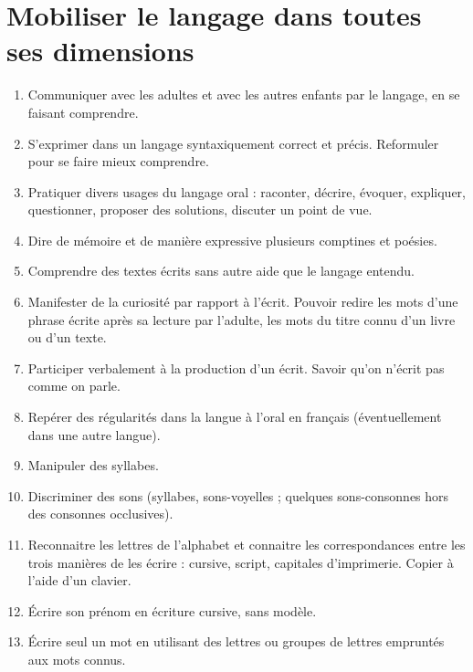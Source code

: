 \section{Mobiliser le langage dans toutes ses dimensions}
\begin{enumerate}
\item Communiquer avec les adultes et avec les autres enfants par le langage, en se faisant comprendre.
\item S’exprimer dans un langage syntaxiquement correct et précis. Reformuler pour se faire mieux comprendre.
\item Pratiquer divers usages du langage oral : raconter, décrire, évoquer, expliquer, questionner, proposer des solutions, discuter un point de vue.
\item Dire de mémoire et de manière expressive plusieurs comptines et poésies.
\item Comprendre des textes écrits sans autre aide que le langage entendu.
\item Manifester de la curiosité par rapport à l’écrit. Pouvoir redire les mots d’une phrase écrite après sa lecture par l’adulte, les mots du titre connu d’un livre ou d’un texte.
\item Participer verbalement à la production d’un écrit. Savoir qu’on n’écrit pas comme on parle.
\item Repérer des régularités dans la langue à l’oral en français (éventuellement dans une autre langue). 
\item Manipuler des syllabes.
\item Discriminer des sons (syllabes, sons-voyelles ; quelques sons-consonnes hors des consonnes occlusives).
\item Reconnaitre les lettres de l’alphabet et connaitre les correspondances entre les trois manières de les écrire : cursive, script, capitales d’imprimerie. Copier à l’aide d’un clavier.
\item Écrire son prénom en écriture cursive, sans modèle.
\item Écrire seul un mot en utilisant des lettres ou groupes de lettres empruntés aux mots connus.
\end{enumerate}

